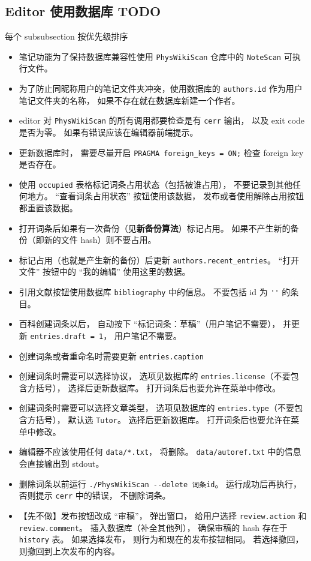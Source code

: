 
\subsection{Editor 使用数据库 TODO}
每个 subsubsection 按优先级排序

\begin{itemize}
\item 笔记功能为了保持数据库兼容性使用 \verb|PhysWikiScan| 仓库中的 \verb|NoteScan| 可执行文件。
\item 为了防止同昵称用户的笔记文件夹冲突，使用数据库的 \verb|authors.id| 作为用户笔记文件夹的名称， 如果不存在就在数据库新建一个作者。
\item editor 对 \verb|PhysWikiScan| 的所有调用都要检查是有 \verb|cerr| 输出， 以及 exit code 是否为零。 如果有错误应该在编辑器前端提示。
\item 更新数据库时， 需要尽量开启 \verb|PRAGMA foreign_keys = ON;| 检查 foreign key 是否存在。
\item 使用 \verb|occupied| 表格标记词条占用状态（包括被谁占用）， 不要记录到其他任何地方。 “查看词条占用状态” 按钮使用该数据， 发布或者使用解除占用按钮都重置该数据。
\item 打开词条后如果有一次备份（见\textbf{新备份算法}）标记占用。 如果不产生新的备份（即新的文件 hash）则不要占用。
\item 标记占用（也就是产生新的备份）后更新 \verb|authors.recent_entries|。 “打开文件” 按钮中的 “我的编辑” 使用这里的数据。
\item 引用文献按钮使用数据库 \verb|bibliography| 中的信息。 不要包括 id 为 \verb|''| 的条目。
\item 百科创建词条以后， 自动按下 “标记词条：草稿”（用户笔记不需要）， 并更新 \verb|entries.draft = 1|， 用户笔记不需要。
\item 创建词条或者重命名时需要更新 \verb|entries.caption|
\item 创建词条时需要可以选择协议， 选项见数据库的 \verb|entries.license|（不要包含方括号）， 选择后更新数据库。 打开词条后也要允许在菜单中修改。
\item 创建词条时需要可以选择文章类型， 选项见数据库的 \verb|entries.type|（不要包含方括号）， 默认选 \verb|Tutor|。 选择后更新数据库。 打开词条后也要允许在菜单中修改。
\item 编辑器不应该使用任何 \verb|data/*.txt|， 将删除。 \verb|data/autoref.txt| 中的信息会直接输出到 stdout。


\item 删除词条以前运行 \verb|./PhysWikiScan --delete 词条id|。 运行成功后再执行， 否则提示 \verb`cerr` 中的错误， 不删除词条。
\item 【先不做】发布按钮改成 “审稿”， 弹出窗口， 给用户选择 \verb|review.action| 和 \verb|review.comment|。 插入数据库（补全其他列）， 确保审稿的 hash 存在于 \verb|history| 表。 如果选择发布， 则行为和现在的发布按钮相同。 若选择撤回， 则撤回到上次发布的内容。
\end{itemize}

